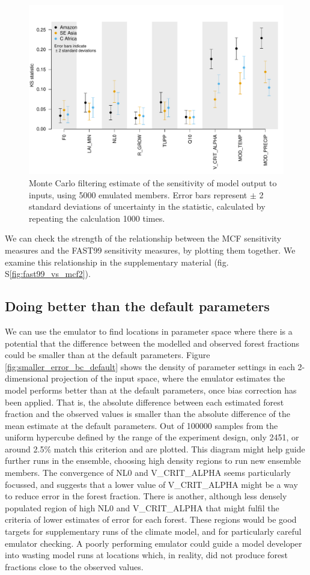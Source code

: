 \documentclass[gmd, manuscript]{copernicus}
\begin{document}
\begin{figure}[t]
\includegraphics[width=12cm]{../graphics/mcf.pdf}
\caption{Monte Carlo filtering estimate of the sensitivity of model output to inputs, using 5000 emulated members. Error bars represent $\pm$ 2 standard deviations of uncertainty in the statistic, calculated by repeating the calculation 1000 times.
}
\label{fig:mcf}
\end{figure}

We can check the strength of the relationship between the MCF sensitivity measures and the FAST99 sensitivity measures, by plotting them together. We examine this relationship in the supplementary material (fig. S\ref{fig:fast99_vs_mcf2}).

\subsection{Doing better than the default parameters}\label{ssec:better_than_default}
We can use the emulator to find locations in parameter space where there is a potential that the difference between the modelled and observed forest fractions could be smaller than at the default parameters. Figure \ref{fig:smaller_error_bc_default} shows the density of parameter settings in each 2-dimensional projection of the input space, where the emulator estimates the model performs better than at the default parameters, once bias correction has been applied. That is, the absolute difference between each estimated forest fraction and the observed values is smaller than the absolute difference of the mean estimate at the default parameters. Out of 100000 samples from the uniform hypercube defined by the range of the experiment design, only 2451, or around 2.5\% match this criterion and are plotted. This diagram might help guide further runs in the ensemble, choosing high density regions to run new ensemble members. The convergence of NL0 and V\_CRIT\_ALPHA seems particularly focussed, and suggests that a lower value of V\_CRIT\_ALPHA might be a way to reduce error in the forest fraction. There is another, although less densely populated region of high NL0 and V\_CRIT\_ALPHA that might fulfil the criteria of lower estimates of error for each forest. These regions would be good targets for supplementary runs of the climate model, and for particularly careful emulator checking. A poorly performing emulator could guide a model developer into wasting model runs at locations which, in reality, did not produce forest fractions close to the observed values.
\end{document}
